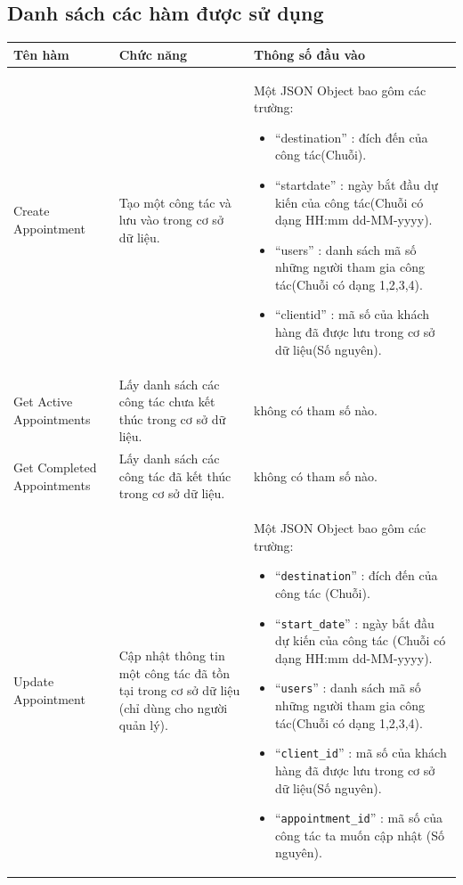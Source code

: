 \documentclass[a4paper]{article}
\begin{document}
\subsection{Danh sách các hàm được sử dụng}
\begin{longtable}{ | p{} |p{} | p{}  | } 
\hline
\textbf{Tên hàm}& \textbf{Chức năng}& \textbf{Thông số đầu vào} \\ 
\hline

\hline
Create Appointment & 
Tạo một công tác và lưu vào trong cơ sở dữ liệu. &
Một JSON Object bao gôm các trường:
\begin{itemize}
  \item “destination” : đích đến của công tác(Chuỗi).
  \item “startdate” : ngày bắt đầu dự kiến của công tác(Chuỗi  có dạng HH:mm dd-MM-yyyy).
  \item “users” : danh sách mã số những người tham gia công tác(Chuỗi có dạng 1,2,3,4).
  \item “clientid” : mã số của khách hàng đã được lưu trong cơ sở dữ liệu(Số  nguyên). 
\end{itemize}
  \\ 
\hline
Get Active Appointments & 
Lấy danh sách các công tác chưa kết thúc trong cơ sở dữ liệu. &
không có tham số nào. \\

\hline
Get Completed Appointments & 
Lấy danh sách các công tác đã kết thúc trong cơ sở dữ liệu. &
không có tham số nào. \\ 

\hline
Update Appointment & 
Cập nhật thông tin một công tác đã tồn tại trong cơ sở dữ liệu (chỉ dùng cho người quản lý). &
Một JSON Object bao gôm các trường: 
\begin{itemize}
  \item “\verb|destination|” : đích đến của công tác (Chuỗi). 
  \item “\verb|start_date|” : ngày bắt đầu dự kiến của công tác (Chuỗi  có dạng HH:mm dd-MM-yyyy).
  \item “\verb|users|” : danh sách mã số những người tham gia công tác(Chuỗi có dạng 1,2,3,4).
  \item “\verb|client_id|” : mã số của khách hàng đã được lưu trong cơ sở dữ liệu(Số  nguyên).
  \item “\verb|appointment_id|” : mã số của công tác ta muốn cập nhật (Số nguyên). 
\end{itemize}
\\ 


\end{longtable}
\end{document}
